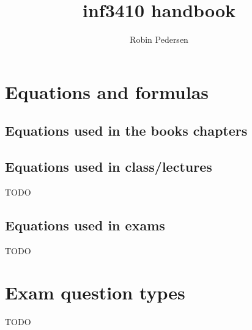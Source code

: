 \documentclass[twocolumn]{article}
\begin{document}
  \title{inf3410 handbook}
  \author{Robin Pedersen}
  \maketitle
  \tableofcontents

  
  \section{Equations and formulas}
    \subsection{Equations used in the books chapters}
      
    \subsection{Equations used in class/lectures}
      TODO
    \subsection{Equations used in exams}
      TODO
  \section{Exam question types}
    TODO
  \printindex
\end{document}
